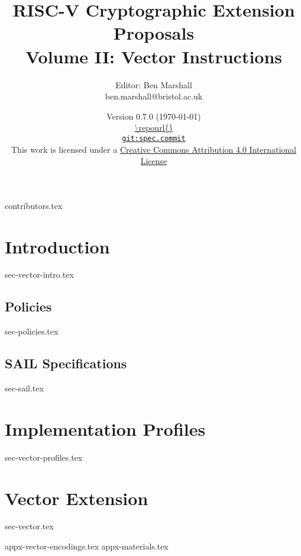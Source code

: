 \documentclass[11pt]{article}
\title{RISC-V Cryptographic Extension Proposals\\Volume II: Vector Instructions}
\author{Editor: Ben Marshall\\ben.marshall@bristol.ac.uk}
\date{Version $0.7.0$ (\today) \\
\medskip
\url{\repourl{}} \\
\href{\repourl{}}{
{\small \tt git:{spec.commit}}} \\
\bigskip
{\small
This work is licensed under a
\href{http://creativecommons.org/licenses/by/4.0/}{Creative Commons Attribution 4.0 International License}
}
}
\begin{document}

\maketitle

{contributors.tex}

\tableofcontents




\newpage
\section{Introduction}
\label{sec:intro}
{sec-vector-intro.tex}

\subsection{Policies}
{sec-policies.tex}

\subsection{SAIL Specifications}
\label{sec:sail}
{sec-sail.tex}

\newpage
\section{Implementation Profiles}
\label{sec:profiles}
{sec-vector-profiles.tex}

\newpage
\section{Vector Extension}
\label{sec:vector}
{sec-vector.tex}


\newpage
\printbibliography


%
%

\newpage
\begin{appendices}
\label{sec:appendix}
{appx-vector-encodings.tex}
{appx-materials.tex}
\end{appendices}

\end{document}

